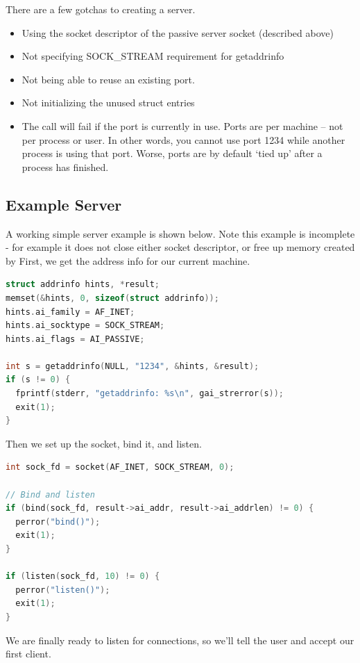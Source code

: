 There are a few gotchas to creating a server.

\begin{itemize}
\item
  Using the socket descriptor of the passive server socket (described above)
\item
  Not specifying SOCK\_STREAM requirement for getaddrinfo
\item
  Not being able to reuse an existing port.
\item
  Not initializing the unused struct entries
\item
  The  call will fail if the port is currently in use. Ports are per machine -- not per process or user.
  In other words, you cannot use port 1234 while another process is using that port.
  Worse, ports are by default `tied up' after a process has finished.
\end{itemize}

\subsection{Example Server}

A working simple server example is shown below.
Note this example is incomplete - for example it does not close either socket descriptor, or free up memory created by 
First, we get the address info for our current machine.

\begin{lstlisting}[language=C]
struct addrinfo hints, *result;
memset(&hints, 0, sizeof(struct addrinfo));
hints.ai_family = AF_INET;
hints.ai_socktype = SOCK_STREAM;
hints.ai_flags = AI_PASSIVE;

int s = getaddrinfo(NULL, "1234", &hints, &result);
if (s != 0) {
  fprintf(stderr, "getaddrinfo: %s\n", gai_strerror(s));
  exit(1);
}
\end{lstlisting}

Then we set up the socket, bind it, and listen.

\begin{lstlisting}[language=C]
int sock_fd = socket(AF_INET, SOCK_STREAM, 0);

// Bind and listen
if (bind(sock_fd, result->ai_addr, result->ai_addrlen) != 0) {
  perror("bind()");
  exit(1);
}

if (listen(sock_fd, 10) != 0) {
  perror("listen()");
  exit(1);
}
\end{lstlisting}

We are finally ready to listen for connections, so we'll tell the user and accept our first client.

